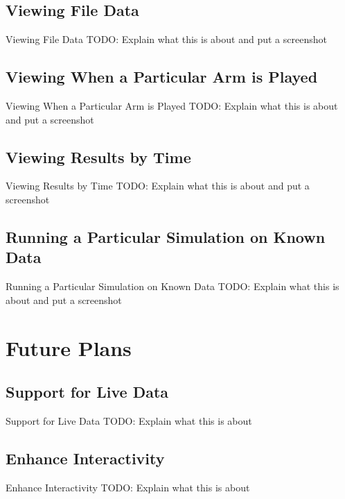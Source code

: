 \documentclass{beamer}
\begin{document}
\subsection{Viewing File Data}
\begin{frame}{Viewing File Data}
TODO: Explain what this is about and put a screenshot
\end{frame}

\subsection{Viewing When a Particular Arm is Played}
\begin{frame}{Viewing When a Particular Arm is Played}
TODO: Explain what this is about and put a screenshot
\end{frame}

\subsection{Viewing Results by Time}
\begin{frame}{Viewing Results by Time}
TODO: Explain what this is about and put a screenshot
\end{frame}

\subsection{Running a Particular Simulation on Known Data}
\begin{frame}{Running a Particular Simulation on Known Data}
TODO: Explain what this is about and put a screenshot
\end{frame}

\section{Future Plans}

\subsection{Support for Live Data}
\begin{frame}{Support for Live Data}
TODO: Explain what this is about
\end{frame}

\subsection{Enhance Interactivity}
\begin{frame}{Enhance Interactivity}
TODO: Explain what this is about
\end{frame}
\end{document}
